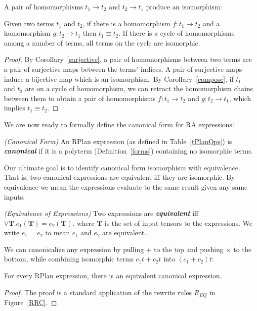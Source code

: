 \documentclass{article}
\begin{document}
A pair of homomorphisms $t_1 \rightarrow t_2$ and $t_2 \rightarrow t_1$ produce an isomorphism: 
\begin{lemma}\label{homocycle}
Given two terms $t_1$ and $t_2$, if there is a homomorphism $f: t_1 \rightarrow t_2$ and a homomorphism $g: t_2 \rightarrow t_1$ then $t_1 \equiv t_2$. If there is a cycle of homomorphisms among a number of terms, all terms on the cycle are isomorphic. 
\end{lemma}{}
\begin{proof}
By Corollary~\ref{surjective}, a pair of homomorphisms between two terms are a pair of surjective maps between the terms' indices. A pair of surjective maps induce a bijective map which is an isomorphism. 
By Corollary~\ref{compose}, if $t_1$ and $t_2$ are on a cycle of homomorphism, we can retract the homomorphism chains between them to obtain a pair of homomorphisms $f: t_1 \rightarrow t_2$ and $g: t_2 \rightarrow t_1$, which implies $t_1 \equiv t_2$. 
\end{proof}{}
We are now ready to formally define the canonical form for RA expressions: 

\begin{definition}{\em (Canonical Form)} An RPlan expression (as defined in Table~\ref{tPlanOps}) is {\em \textbf{canonical}} if it is a polyterm (Definition~\ref{forms}) containing no isomorphic terms. 
\end{definition}{}

Our ultimate goal is to identify canonical form isomorphism with equivalence. That is, two canonical expressions are equivalent iff they are isomorphic. By equivalence we mean the expressions evaluate to the same result given any same inputs: 

\begin{definition}{\em (Equivalence of Expressions)} Two expressions are {\em \textbf{equivalent}} iff $\forall \pmb{T}. e_1(\pmb{T}) = e_2(\pmb{T})$, where $\pmb{T}$ is the set of input tensors to the expressions. We write $e_1 = e_2$ to mean $e_1$ and $e_2$ are equivalent. 
\end{definition}{}

We can canonicalize any expression by pulling $+$ to the top and pushing $\times$ to the bottom, while combining isomorphic terms $c_1 t + c_2 t$ into $(c_1 + c_2) t$: 

\begin{lemma}
For every RPlan expression, there is an equivalent canonical expression. 
\end{lemma}{}
\begin{proof}
The proof is a standard application of the rewrite rules $R_{EQ}$ in Figure~\ref{RRC}. 
\end{proof}{}
\end{document}
